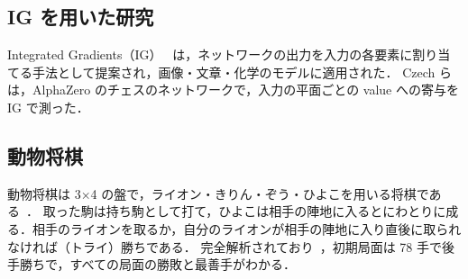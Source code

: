 \documentclass[submit]{ipsj}
\begin{document}
\subsection{IG を用いた研究}
Integrated Gradients（IG）~\cite{ig} は，ネットワークの出力を入力の各要素に割り当てる手法として提案され，画像・文章・化学のモデルに適用された．
Czech ら~\cite{czech2024} は，AlphaZero のチェスのネットワークで，入力の平面ごとの value への寄与を IG で測った．


\subsection{動物将棋}
動物将棋は 3×4 の盤で，ライオン・きりん・ぞう・ひよこを用いる将棋である~\cite{tanaka2009}．
取った駒は持ち駒として打て，ひよこは相手の陣地に入るとにわとりに成る．相手のライオンを取るか，自分のライオンが相手の陣地に入り直後に取られなければ（トライ）勝ちである．
完全解析されており~\cite{tanaka2009}，初期局面は 78 手で後手勝ちで，すべての局面の勝敗と最善手がわかる．
\end{document}
